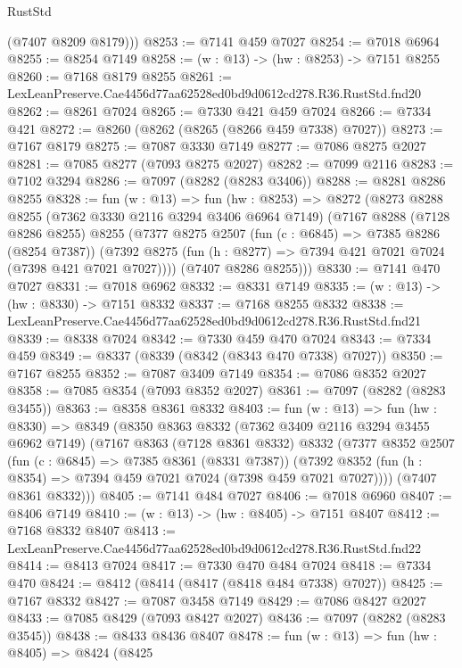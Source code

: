\begin{lexlean}{RustStd}
\begin{coremodule}
        (@7407 @8209 @8179)))
@8253 := @7141 @459 @7027
@8254 := @7018 @6964
@8255 := @8254 @7149
@8258 := (w : @13) -> (hw : @8253) -> @7151 @8255
@8260 := @7168 @8179 @8255
@8261 := LexLeanPreserve.Cae4456d77aa62528ed0bd9d0612cd278.R36.RustStd.fnd20
@8262 := @8261 @7024
@8265 := @7330 @421 @459 @7024
@8266 := @7334 @421
@8272 := @8260 (@8262 (@8265 (@8266 @459 @7338) @7027))
@8273 := @7167 @8179
@8275 := @7087 @3330 @7149
@8277 := @7086 @8275 @2027
@8281 := @7085 @8277 (@7093 @8275 @2027)
@8282 := @7099 @2116
@8283 := @7102 @3294
@8286 := @7097 (@8282 (@8283 @3406))
@8288 := @8281 @8286 @8255
@8328 := fun (w : @13) =>
  fun (hw : @8253) =>
  @8272
    (@8273
      @8288
      @8255
      (@7362 @3330 @2116 @3294 @3406 @6964 @7149)
      (@7167
        @8288
        (@7128 @8286 @8255)
        @8255
        (@7377
          @8275
          @2507
          (fun (c : @6845) => @7385 @8286 (@8254 @7387))
          (@7392 @8275 (fun (h : @8277) => @7394 @421 @7021 @7024 (@7398 @421 @7021 @7027))))
        (@7407 @8286 @8255)))
@8330 := @7141 @470 @7027
@8331 := @7018 @6962
@8332 := @8331 @7149
@8335 := (w : @13) -> (hw : @8330) -> @7151 @8332
@8337 := @7168 @8255 @8332
@8338 := LexLeanPreserve.Cae4456d77aa62528ed0bd9d0612cd278.R36.RustStd.fnd21
@8339 := @8338 @7024
@8342 := @7330 @459 @470 @7024
@8343 := @7334 @459
@8349 := @8337 (@8339 (@8342 (@8343 @470 @7338) @7027))
@8350 := @7167 @8255
@8352 := @7087 @3409 @7149
@8354 := @7086 @8352 @2027
@8358 := @7085 @8354 (@7093 @8352 @2027)
@8361 := @7097 (@8282 (@8283 @3455))
@8363 := @8358 @8361 @8332
@8403 := fun (w : @13) =>
  fun (hw : @8330) =>
  @8349
    (@8350
      @8363
      @8332
      (@7362 @3409 @2116 @3294 @3455 @6962 @7149)
      (@7167
        @8363
        (@7128 @8361 @8332)
        @8332
        (@7377
          @8352
          @2507
          (fun (c : @6845) => @7385 @8361 (@8331 @7387))
          (@7392 @8352 (fun (h : @8354) => @7394 @459 @7021 @7024 (@7398 @459 @7021 @7027))))
        (@7407 @8361 @8332)))
@8405 := @7141 @484 @7027
@8406 := @7018 @6960
@8407 := @8406 @7149
@8410 := (w : @13) -> (hw : @8405) -> @7151 @8407
@8412 := @7168 @8332 @8407
@8413 := LexLeanPreserve.Cae4456d77aa62528ed0bd9d0612cd278.R36.RustStd.fnd22
@8414 := @8413 @7024
@8417 := @7330 @470 @484 @7024
@8418 := @7334 @470
@8424 := @8412 (@8414 (@8417 (@8418 @484 @7338) @7027))
@8425 := @7167 @8332
@8427 := @7087 @3458 @7149
@8429 := @7086 @8427 @2027
@8433 := @7085 @8429 (@7093 @8427 @2027)
@8436 := @7097 (@8282 (@8283 @3545))
@8438 := @8433 @8436 @8407
@8478 := fun (w : @13) =>
  fun (hw : @8405) =>
  @8424
    (@8425

\end{coremodule}
\end{lexlean}
